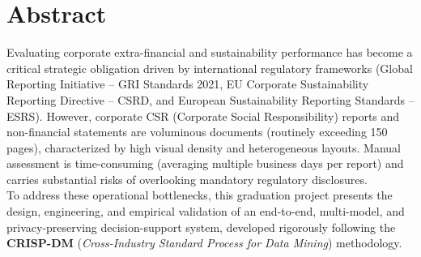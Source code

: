 \documentclass[12pt,a4paper]{report}
\begin{document}
\newpage

\chapter*{Abstract}

Evaluating corporate extra-financial and sustainability performance has become a critical strategic obligation driven by international regulatory frameworks (Global Reporting Initiative -- GRI Standards 2021, EU Corporate Sustainability Reporting Directive -- CSRD, and European Sustainability Reporting Standards -- ESRS). However, corporate CSR (Corporate Social Responsibility) reports and non-financial statements are voluminous documents (routinely exceeding 150 pages), characterized by high visual density and heterogeneous layouts. Manual assessment is time-consuming (averaging multiple business days per report) and carries substantial risks of overlooking mandatory regulatory disclosures.\\

To address these operational bottlenecks, this graduation project presents the design, engineering, and empirical validation of an end-to-end, multi-model, and privacy-preserving decision-support system, developed rigorously following the \textbf{CRISP-DM} (\textit{Cross-Industry Standard Process for Data Mining}) methodology.\\
\end{document}
